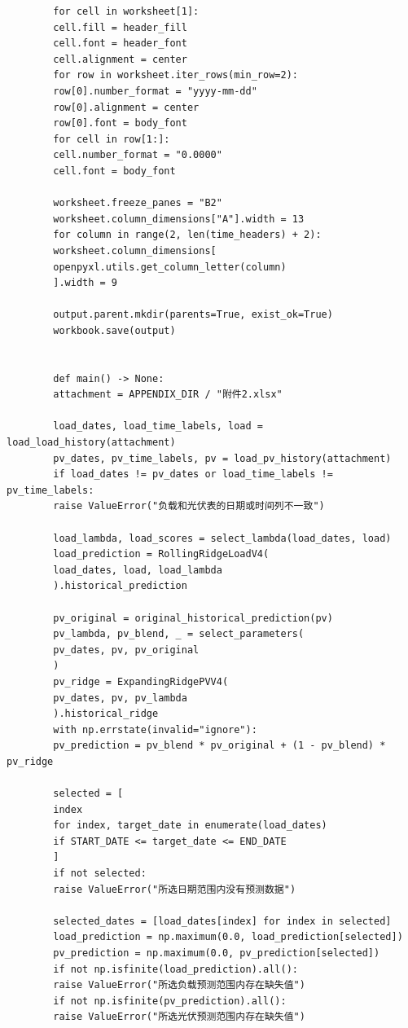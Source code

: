 \documentclass[UTF8]{ctexart}
\begin{document}
\begin{verbatim}
        for cell in worksheet[1]:
        cell.fill = header_fill
        cell.font = header_font
        cell.alignment = center
        for row in worksheet.iter_rows(min_row=2):
        row[0].number_format = "yyyy-mm-dd"
        row[0].alignment = center
        row[0].font = body_font
        for cell in row[1:]:
        cell.number_format = "0.0000"
        cell.font = body_font
        
        worksheet.freeze_panes = "B2"
        worksheet.column_dimensions["A"].width = 13
        for column in range(2, len(time_headers) + 2):
        worksheet.column_dimensions[
        openpyxl.utils.get_column_letter(column)
        ].width = 9
        
        output.parent.mkdir(parents=True, exist_ok=True)
        workbook.save(output)
        
        
        def main() -> None:
        attachment = APPENDIX_DIR / "附件2.xlsx"
        
        load_dates, load_time_labels, load = load_load_history(attachment)
        pv_dates, pv_time_labels, pv = load_pv_history(attachment)
        if load_dates != pv_dates or load_time_labels != pv_time_labels:
        raise ValueError("负载和光伏表的日期或时间列不一致")
        
        load_lambda, load_scores = select_lambda(load_dates, load)
        load_prediction = RollingRidgeLoadV4(
        load_dates, load, load_lambda
        ).historical_prediction
        
        pv_original = original_historical_prediction(pv)
        pv_lambda, pv_blend, _ = select_parameters(
        pv_dates, pv, pv_original
        )
        pv_ridge = ExpandingRidgePVV4(
        pv_dates, pv, pv_lambda
        ).historical_ridge
        with np.errstate(invalid="ignore"):
        pv_prediction = pv_blend * pv_original + (1 - pv_blend) * pv_ridge
        
        selected = [
        index
        for index, target_date in enumerate(load_dates)
        if START_DATE <= target_date <= END_DATE
        ]
        if not selected:
        raise ValueError("所选日期范围内没有预测数据")
        
        selected_dates = [load_dates[index] for index in selected]
        load_prediction = np.maximum(0.0, load_prediction[selected])
        pv_prediction = np.maximum(0.0, pv_prediction[selected])
        if not np.isfinite(load_prediction).all():
        raise ValueError("所选负载预测范围内存在缺失值")
        if not np.isfinite(pv_prediction).all():
        raise ValueError("所选光伏预测范围内存在缺失值")
        

\end{verbatim}
\end{document}
